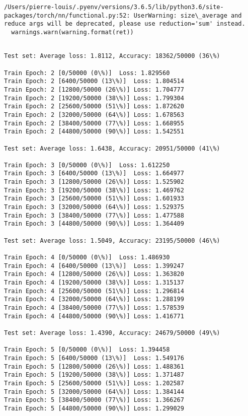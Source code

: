 \documentclass[11pt]{article}
\begin{document}
    \begin{Verbatim}[commandchars=\\\{\}]
/Users/pierre-louis/.pyenv/versions/3.6.5/lib/python3.6/site-packages/torch/nn/functional.py:52: UserWarning: size\_average and reduce args will be deprecated, please use reduction='sum' instead.
  warnings.warn(warning.format(ret))

    \end{Verbatim}

    \begin{Verbatim}[commandchars=\\\{\}]

Test set: Average loss: 1.8112, Accuracy: 18362/50000 (36\%)

Train Epoch: 2 [0/50000 (0\%)]	Loss: 1.829560
Train Epoch: 2 [6400/50000 (13\%)]	Loss: 1.804514
Train Epoch: 2 [12800/50000 (26\%)]	Loss: 1.704777
Train Epoch: 2 [19200/50000 (38\%)]	Loss: 1.799304
Train Epoch: 2 [25600/50000 (51\%)]	Loss: 1.872620
Train Epoch: 2 [32000/50000 (64\%)]	Loss: 1.678563
Train Epoch: 2 [38400/50000 (77\%)]	Loss: 1.668955
Train Epoch: 2 [44800/50000 (90\%)]	Loss: 1.542551

Test set: Average loss: 1.6438, Accuracy: 20951/50000 (41\%)

Train Epoch: 3 [0/50000 (0\%)]	Loss: 1.612250
Train Epoch: 3 [6400/50000 (13\%)]	Loss: 1.664977
Train Epoch: 3 [12800/50000 (26\%)]	Loss: 1.525902
Train Epoch: 3 [19200/50000 (38\%)]	Loss: 1.469762
Train Epoch: 3 [25600/50000 (51\%)]	Loss: 1.601933
Train Epoch: 3 [32000/50000 (64\%)]	Loss: 1.529375
Train Epoch: 3 [38400/50000 (77\%)]	Loss: 1.477588
Train Epoch: 3 [44800/50000 (90\%)]	Loss: 1.364409

Test set: Average loss: 1.5049, Accuracy: 23195/50000 (46\%)

Train Epoch: 4 [0/50000 (0\%)]	Loss: 1.486930
Train Epoch: 4 [6400/50000 (13\%)]	Loss: 1.399247
Train Epoch: 4 [12800/50000 (26\%)]	Loss: 1.363820
Train Epoch: 4 [19200/50000 (38\%)]	Loss: 1.315137
Train Epoch: 4 [25600/50000 (51\%)]	Loss: 1.296814
Train Epoch: 4 [32000/50000 (64\%)]	Loss: 1.288199
Train Epoch: 4 [38400/50000 (77\%)]	Loss: 1.578539
Train Epoch: 4 [44800/50000 (90\%)]	Loss: 1.416771

Test set: Average loss: 1.4390, Accuracy: 24679/50000 (49\%)

Train Epoch: 5 [0/50000 (0\%)]	Loss: 1.394458
Train Epoch: 5 [6400/50000 (13\%)]	Loss: 1.549176
Train Epoch: 5 [12800/50000 (26\%)]	Loss: 1.488361
Train Epoch: 5 [19200/50000 (38\%)]	Loss: 1.371487
Train Epoch: 5 [25600/50000 (51\%)]	Loss: 1.202587
Train Epoch: 5 [32000/50000 (64\%)]	Loss: 1.384144
Train Epoch: 5 [38400/50000 (77\%)]	Loss: 1.366267
Train Epoch: 5 [44800/50000 (90\%)]	Loss: 1.299029


\end{Verbatim}
\end{document}
